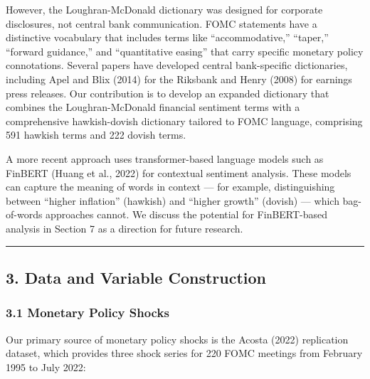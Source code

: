 \documentclass[
]{article}
\begin{document}
However, the Loughran-McDonald dictionary was designed for corporate
disclosures, not central bank communication. FOMC statements have a
distinctive vocabulary that includes terms like ``accommodative,''
``taper,'' ``forward guidance,'' and ``quantitative easing'' that carry
specific monetary policy connotations. Several papers have developed
central bank-specific dictionaries, including Apel and Blix (2014) for
the Riksbank and Henry (2008) for earnings press releases. Our
contribution is to develop an expanded dictionary that combines the
Loughran-McDonald financial sentiment terms with a comprehensive
hawkish-dovish dictionary tailored to FOMC language, comprising 591
hawkish terms and 222 dovish terms.

A more recent approach uses transformer-based language models such as
FinBERT (Huang et al., 2022) for contextual sentiment analysis. These
models can capture the meaning of words in context --- for example,
distinguishing between ``higher inflation'' (hawkish) and ``higher
growth'' (dovish) --- which bag-of-words approaches cannot. We discuss
the potential for FinBERT-based analysis in Section 7 as a direction for
future research.

\begin{center}\rule{0.5\linewidth}{0.5pt}\end{center}

\subsection{3. Data and Variable
Construction}\label{data-and-variable-construction}

\subsubsection{3.1 Monetary Policy Shocks}\label{monetary-policy-shocks}

Our primary source of monetary policy shocks is the Acosta (2022)
replication dataset, which provides three shock series for 220 FOMC
meetings from February 1995 to July 2022:
\end{document}
